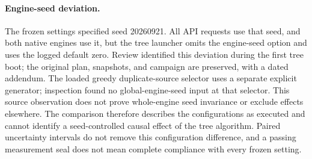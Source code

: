 \paragraph{Engine-seed deviation.}
The frozen settings specified seed 20260921. All API requests use that seed, and both native engines use it, but the tree launcher omits the engine-seed option and uses the logged default zero. Review identified this deviation during the first tree boot; the original plan, snapshots, and campaign are preserved, with a dated addendum. The loaded greedy duplicate-source selector uses a separate explicit generator; inspection found no global-engine-seed input at that selector. This source observation does not prove whole-engine seed invariance or exclude effects elsewhere. The comparison therefore describes the configurations as executed and cannot identify a seed-controlled causal effect of the tree algorithm. Paired uncertainty intervals do not remove this configuration difference, and a passing measurement seal does not mean complete compliance with every frozen setting.
